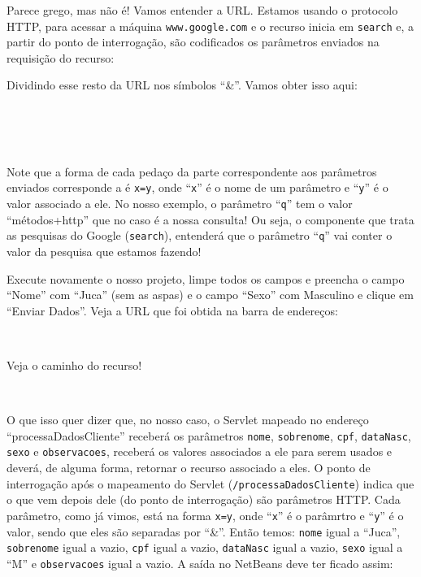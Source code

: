
Parece grego, mas não é! Vamos entender a URL. Estamos usando o protocolo HTTP, para acessar a máquina \texttt{www.google.com} e o recurso inicia em \texttt{search} e, a partir do ponto de interrogação, são codificados os parâmetros enviados na requisição do recurso:


Dividindo esse resto da URL nos símbolos ``\&''. Vamos obter isso aqui:

\\
\\
\\

Note que a forma de cada pedaço da parte correspondente aos parâmetros enviados corresponde a é \texttt{x=y}, onde ``\texttt{x}'' é o nome de um parâmetro e ``\texttt{y}'' é o valor associado a ele. No nosso exemplo, o parâmetro ``\texttt{q}'' tem o valor ``métodos+http'' que no caso é a nossa consulta! Ou seja, o componente que trata as pesquisas do Google (\texttt{search}), entenderá que o parâmetro ``\texttt{q}'' vai conter o valor da pesquisa que estamos fazendo!

Execute novamente o nosso projeto, limpe todos os campos e preencha o campo ``Nome'' com ``Juca'' (sem as aspas) e o campo ``Sexo'' com Masculino e clique em ``Enviar Dados''. Veja a URL que foi obtida na barra de endereços:

\\

Veja o caminho do recurso!

\\

O que isso quer dizer que, no nosso caso, o Servlet mapeado no endereço ``processaDadosCliente'' receberá os parâmetros \texttt{nome}, \texttt{sobrenome}, \texttt{cpf}, \texttt{dataNasc}, \texttt{sexo} e \texttt{observacoes}, receberá os valores associados a ele para serem usados e deverá, de alguma forma, retornar o recurso associado a eles. O ponto de interrogação após o mapeamento do Servlet (\texttt{/processaDadosCliente}) indica que o que vem depois dele (do ponto de interrogação) são parâmetros HTTP. Cada parâmetro, como já vimos, está na forma \texttt{x=y}, onde ``\texttt{x}'' é o parâmrtro e ``\texttt{y}'' é o valor, sendo que eles são separadas por ``\&''. Então temos: \texttt{nome} igual a ``Juca'', \texttt{sobrenome} igual a vazio, \texttt{cpf} igual a vazio, \texttt{dataNasc} igual a vazio, \texttt{sexo} igual a ``M'' e \texttt{observacoes} igual a vazio. A saída no NetBeans deve ter ficado assim:

